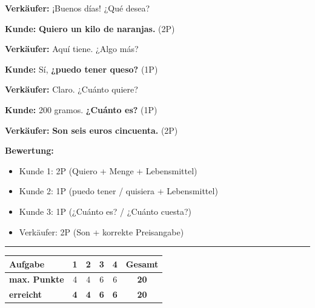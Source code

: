 \documentclass[11pt, a4paper]{article}
\newcommand{\lsg}[1]{\textcolor{loesung}{\textbf{#1}}}
\begin{document}
\noindent
\textbf{Verkäufer:} ¡Buenos días! ¿Qué desea?

\vspace{0.8em}

\noindent
\textbf{Kunde:} \lsg{Quiero un kilo de naranjas.} \hfill (2P)

\vspace{0.8em}

\noindent
\textbf{Verkäufer:} Aquí tiene. ¿Algo más?

\vspace{0.8em}

\noindent
\textbf{Kunde:} Sí, \lsg{¿puedo tener queso?} \hfill (1P)

\vspace{0.8em}

\noindent
\textbf{Verkäufer:} Claro. ¿Cuánto quiere?

\vspace{0.8em}

\noindent
\textbf{Kunde:} 200 gramos. \lsg{¿Cuánto es?} \hfill (1P)

\vspace{0.8em}

\noindent
\textbf{Verkäufer:} \lsg{Son seis euros cincuenta.} \hfill (2P)

\textbf{Bewertung:}
\begin{itemize}[noitemsep]
    \item Kunde 1: 2P (Quiero + Menge + Lebensmittel)
    \item Kunde 2: 1P (puedo tener / quisiera + Lebensmittel)
    \item Kunde 3: 1P (¿Cuánto es? / ¿Cuánto cuesta?)
    \item Verkäufer: 2P (Son + korrekte Preisangabe)
\end{itemize}

\vspace{25pt}
\hrule
\vspace{10pt}

\noindent
\begin{tabularx}{\textwidth}{|X|c|c|c|c||c|}
\hline
\textbf{Aufgabe} & 1 & 2 & 3 & 4 & \textbf{Gesamt} \\
\hline
\textbf{max. Punkte} & 4 & 4 & 6 & 6 & \textbf{20} \\
\hline
\textbf{erreicht} & \lsg{4} & \lsg{4} & \lsg{6} & \lsg{6} & \lsg{20} \\
\hline
\end{tabularx}

\vspace{10pt}
\end{document}
